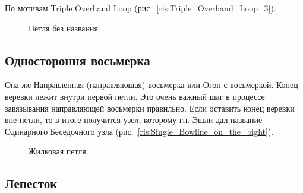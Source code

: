 По мотивам Triple Overhand Loop (рис.~\ref{ris:Triple_Overhand_Loop_3}).

\begin{figure}[H]\centering
	\begin{minipage}{1\linewidth}
		\begin{center}
			\tcbox[enhanced jigsaw,colframe=black,opacityframe=0.5,opacityback=0.5]
			{\centering{}}
		\end{center}
	\end{minipage}
\caption{Петля без названия .}
\label{ris:Triple_Overhand_Loop_2_1}
\end{figure}

\subsection{Одностороння восьмерка}

Она же Направленная (направляющая) восьмерка или Огон с восьмеркой. Конец веревки лежит внутри первой петли. Это очень важный шаг в процессе завязывания направляющей восьмерки правильно. Если оставить конец веревки вне петли, то в итоге получится узел, которому гн. Эшли дал название Одинарного Беседочного узла (рис.~\ref{ris:Single_Bowline_on_the_bight}).

\begin{figure}[H]\centering
	\subfloat[Завязывание]{\label{ris:One_strand_figure_of_eight_1}
	\tcbox[enhanced jigsaw,colframe=black,opacityframe=0.5,opacityback=0.5]
		{\centering
			}
		}
\end{figure}

\begin{figure}[H]\centering
	\subfloat[Результат]{\label{ris:One_strand_figure_of_eight_2}
	\tcbox[enhanced jigsaw,colframe=black,opacityframe=0.5,opacityback=0.5]
		{\centering
			}
		}
	\caption{Жилковая петля.}\label{ris:One_strand_figure_of_eight}
\end{figure}

\subsection{Лепесток}

\begin{figure}[H]\centering
	\subfloat[Завязывание]{\label{ris:Lepestok_1}
	\tcbox[enhanced jigsaw,colframe=black,opacityframe=0.5,opacityback=0.5]
		{\centering
			}
		}
\end{figure}

